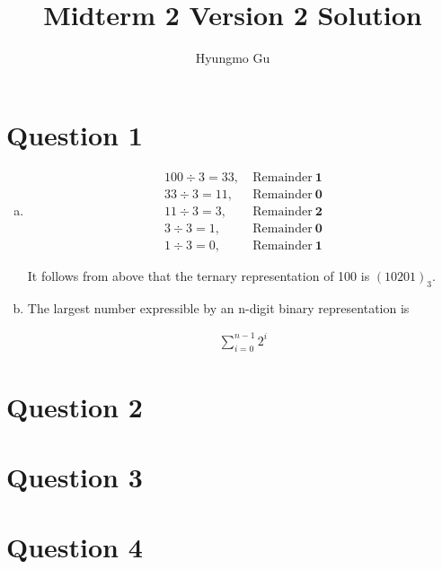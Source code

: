 \documentclass[12pt]{article}
\begin{document}
\title{Midterm 2 Version 2 Solution}
\author{Hyungmo Gu}
\maketitle

\section*{Question 1}
\begin{enumerate}[a.]
    \item

    \begin{align*}
        100 \div 3 = 33,&\:\text{Remainder}\:\textbf{1}\\
        33 \div 3 = 11,&\:\text{Remainder}\:\textbf{0}\\
        11 \div 3 = 3,&\:\text{Remainder}\:\textbf{2}\\
        3 \div 3 = 1,&\:\text{Remainder}\:\textbf{0}\\
        1 \div 3 = 0,&\:\text{Remainder}\:\textbf{1}
    \end{align*}

    \bigskip

    It follows from above that the ternary representation of 100 is $(10201)_3$.

    \item The largest number expressible by an n-digit binary representation is

    \setcounter{equation}{0}
    \begin{align}
        \sum\limits_{i=0}^{n-1} 2^i
    \end{align}


\end{enumerate}

\section*{Question 2}

\section*{Question 3}

\section*{Question 4}
\end{document}
